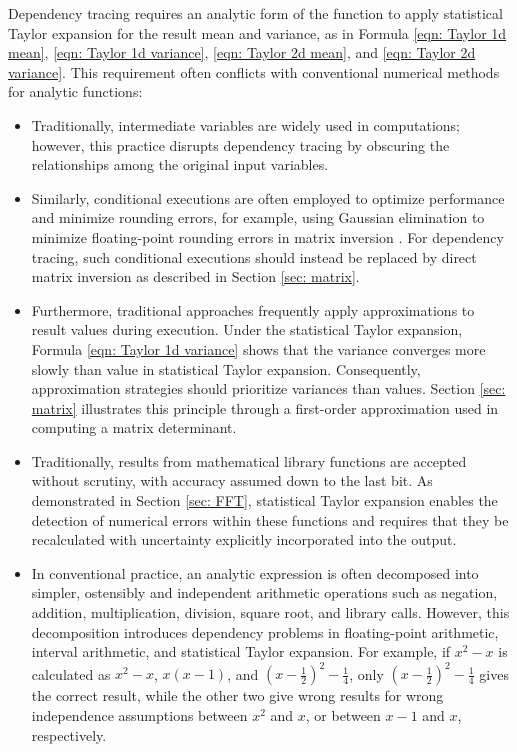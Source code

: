 \documentclass[twoside]{article}
\numberwithin{equation}{section}
\begin{document}
Dependency tracing requires an analytic form of the function to apply statistical Taylor expansion for the result mean and variance, as in Formula \eqref{eqn: Taylor 1d mean}, \eqref{eqn: Taylor 1d variance}, \eqref{eqn: Taylor 2d mean}, and \eqref{eqn: Taylor 2d variance}.
This requirement often conflicts with conventional numerical methods for analytic functions:
\begin{itemize}

\item
Traditionally, intermediate variables are widely used in computations; however, this practice disrupts dependency tracing by obscuring the relationships among the original input variables.

\item
Similarly, conditional executions are often employed to optimize performance and minimize rounding errors, for example, using Gaussian elimination to minimize floating-point rounding errors in matrix inversion \cite{Linear_Algebra}.  
For dependency tracing, such conditional executions should instead be replaced by direct matrix inversion as described in Section \ref{sec: matrix}.

\item 
Furthermore, traditional approaches frequently apply approximations to result values during execution.
Under the statistical Taylor expansion, Formula \eqref{eqn: Taylor 1d variance} shows that the variance converges more slowly than value in statistical Taylor expansion.
Consequently, approximation strategies should prioritize variances than values.
Section \ref{sec: matrix} illustrates this principle through a first-order approximation used in computing a matrix determinant.

\item
Traditionally, results from mathematical library functions are accepted without scrutiny, with accuracy assumed down to the last bit.
As demonstrated in Section \ref{sec: FFT}, statistical Taylor expansion enables the detection of numerical errors within these functions and requires that they be recalculated with uncertainty explicitly incorporated into the output.

\item 
In conventional practice, an analytic expression is often decomposed into simpler, ostensibly and independent arithmetic operations such as negation, addition, multiplication, division, square root, and library calls.
However, this decomposition introduces dependency problems in floating-point arithmetic, interval arithmetic, and statistical Taylor expansion.
For example, if $x^2 - x$ is calculated as $x^2 - x$, $x(x - 1)$, and $(x - \frac{1}{2})^2 - \frac{1}{4}$, only $(x - \frac{1}{2})^2 - \frac{1}{4}$ gives the correct result, while the other two give wrong results for wrong independence assumptions between $x^2$ and $x$, or between $x -1$ and $x$, respectively.


\end{itemize}
\end{document}
